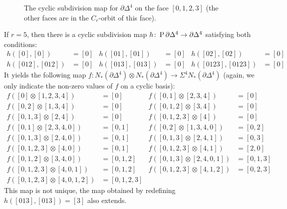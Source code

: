 \begin{figure}
    \caption{The cyclic subdivision map for $\partial \Delta^4$ on the face $[0,1,2,3]$ (the other faces are in the $C_r$-orbit of this face).}
    \label{fig:my_label}
\end{figure}

If $r=5$, then there is a cyclic subdivision map $h\colon \operatorname{P} \partial \Delta^4\to \partial \Delta^4$ satisfying both conditions: 
\begin{align*}
    h([0],[0]) &= [0] &
	h([01],[01]) &= [0] &
	h([02],[02]) &= [0] \\
	h([012],[012]) &= [0] &
	h([013],[013]) &= [0] &
	h([0123],[0123]) &= [0]
\end{align*}
It yields the following map $f\colon N_*(\partial \Delta^4)\otimes N_*(\partial \Delta^4)\to \Sigma^4N_*(\partial \Delta^4)$ (again, we only indicate the non-zero values of $f$ on a cyclic basis):
\begin{align*}
	f([0]\otimes[1,2,3,4]) &= [0] &
	f([0,1]\otimes [2,3,4]) &= [0] \\
	f([0,2]\otimes [1,3,4]) &= [0] &
	f([0,1,2]\otimes [3,4]) &= [0] \\
	f([0,1,3]\otimes [2,4]) &= [0] &
	f([0,1,2,3]\otimes [4]) &= [0] \\
	f([0,1]\otimes [2,3,4,0]) &= [0,1] &
	f([0,2]\otimes [1,3,4,0]) &= [0,2] \\
	f([0,1,3]\otimes [2,4,0]) &= [0,1] &
	f([0,1,3]\otimes [2,4,1]) &= [0,3] \\
	f([0,1,2,3]\otimes [4,0]) &= [0,1] &
	f([0,1,2,3]\otimes [4,1]) &= [2,0] \\
	f([0,1,2]\otimes [3,4,0]) &= [0,1,2] &
	f([0,1,3]\otimes [2,4,0,1]) &= [0,1,3] \\
	f([0,1,2,3]\otimes [4,0,1]) &= [0,1,2] &
	f([0,1,2,3]\otimes [4,1,2]) &= [0,2,3] \\
	f([0,1,2,3]\otimes [4,0,1,2]) &= [0,1,2,3] 
\end{align*}
This map is not unique, the map obtained by redefining $h([013],[013]) = [3]$ also extends. 

